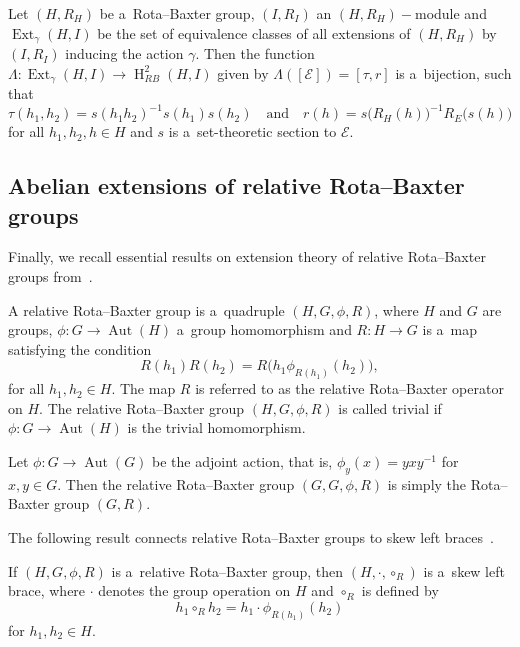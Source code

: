 \documentclass{jonasart}
\theoremstyle{plain}
\DeclareMathOperator{\Aut}{Aut}
\DeclareMathOperator{\Ext}{Ext}
\DeclareMathOperator{\Ho}{H}
\begin{document}
	\begin{theorem}\label{extnrb}
		Let $(H,R_H )$ be a~Rota--Baxter group, $(I,R_I )$ an $(H,R_H )-$module and $\Ext_\gamma(H,I)$ be the set of equivalence classes of all extensions of $(H,R_H )$ by $(I,R_I )$ inducing the action $\gamma$. Then the function $\Lambda:\Ext_{\gamma}(H, I) \rightarrow \Ho^2_{RB}(H, I)$ given by $\Lambda([\mathcal{E}])=[\tau, r]$ is a~bijection, such that
		\[
		\tau(h_1, h_2) = s(h_1  h_2)^{-1}  s(h_1)  s(h_2)
		\quad \text{and} \quad
		r(h) = s \big(R_H(h)\big)^{-1}R_E \big(s(h)\big)
		\]
		for all $h_1, h_2, h \in H$	and $s$ is a~set-theoretic section to $\mathcal{E}$.
	\end{theorem}
	
	\subsection{Abelian extensions of relative Rota--Baxter groups}\label{cohomology RRB}
	Finally, we recall essential results on extension theory of relative Rota--Baxter groups from~\cite{MR4819014}.
	
	\begin{definition}
		A relative Rota--Baxter group is a~quadruple $(H, G, \phi, R)$, where $H$ and $G$ are groups, $\phi: G \rightarrow \Aut(H)$ a~group homomorphism and $R: H \rightarrow G$ is a~map satisfying the condition
		\[
		R(h_1) R(h_2)=R\big(h_1 \phi_{R(h_1)}(h_2) \big),
		\]
		for all $h_1, h_2 \in H$. The map $R$ is referred to as the relative Rota--Baxter operator on $H$. The relative Rota--Baxter group $(H, G, \phi, R)$ is called trivial if $\phi: G \to \Aut(H)$ is the trivial homomorphism.
	\end{definition}
	
	\begin{remark}\label{RRB is RB}
		Let $\phi: G \to \Aut(G)$ be the adjoint action, that is, $\phi_y (x) = yxy^{-1}$ for $x, y \in G$. Then the relative Rota--Baxter group $(G, G,\phi, R)$ is simply the Rota--Baxter group $(G, R)$.
	\end{remark}
	
	The following result connects relative Rota--Baxter groups to skew left braces~\cite[Proposition 3.6]{MR4857550}.
	
	\begin{proposition}
		If $(H, G, \phi, R)$ is a~relative Rota--Baxter group, then $(H, \cdot, \circ_R )$ is a~skew left brace, where $\cdot$ denotes the group operation on $H$ and $\circ_R$ is defined by
		\[
		h_1 \circ_R h_2 = h_1\cdot \phi_{R(h_1)}(h_2)
		\]
		for $h_1, h_2 \in H$.
	\end{proposition}
	
\end{document}
